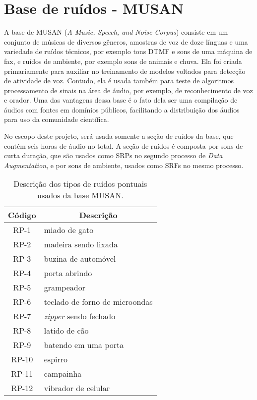 \section{Base de ruídos - MUSAN}

A base de MUSAN (\textit{A Music, Speech, and Noise Corpus}) \cite{noiseLib} consiste em um conjunto de músicas de diversos gêneros,
amostras de voz de doze línguas e uma variedade de ruídos técnicos, por exemplo tons DTMF e sons de uma máquina de fax, e ruídos de ambiente,
por exemplo sons de animais e chuva.
Ela foi criada primariamente para auxiliar no treinamento de modelos voltados para detecção de atividade de voz. 
Contudo, ela é usada também para teste de algoritmos processamento de sinais na área de áudio, por exemplo, de reconhecimento de voz e orador.
Uma das vantagens dessa base é o fato dela ser uma compilação de áudios com fontes em domínios públicos, facilitando a 
distribuição dos áudios para uso da comunidade científica.

No escopo deste projeto, será usada somente a seção de ruídos da base, que contém seis horas de áudio no total.
A seção de ruídos é composta por sons de curta duração, que são usados como SRPs no segundo processo de 
\textit{Data Augmentation}, e por sons de ambiente, usados como SRFs no mesmo processo.

\begin{table} [H]
    \centering
    \caption{Descrição dos tipos de ruídos pontuais usados da base MUSAN.}
    \label{tbl:noise}
    \begin{tabular}{c|l}

        \multicolumn{1}{c|}{\textbf{Código}} & \multicolumn{1}{c}{\textbf{Descrição}} \\
        \hline 

        RP-1 & miado de gato \\
        RP-2 & madeira sendo lixada \\
        RP-3 & buzina de automóvel \\
        RP-4 & porta abrindo \\
        RP-5 & grampeador \\
        RP-6 & teclado de forno de microondas \\
        RP-7 & \textit{zipper} sendo fechado \\
        RP-8 & latido de cão \\
        RP-9 & batendo em uma porta \\
        RP-10 & espirro \\
        RP-11 & campainha \\
        RP-12 & vibrador de celular \\

    \end{tabular}
\end{table}

